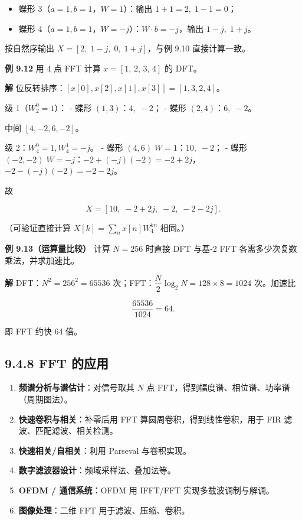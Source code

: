 \begin{itemize}
\tightlist
\item
  蝶形 3（\(a=1,b=1\)，\(W=1\)）：输出 \(1+1=2,\;1-1=0\)；
\item
  蝶形 4（\(a=1,b=1\)，\(W=-j\)）：\(W\cdot b=-j\)，输出 \(1-j,\;1+j\)。
\end{itemize}

按自然序输出 \(X=[2,\;1-j,\;0,\;1+j]\)，与例 9.10 直接计算一致。

\textbf{例 9.12} 用 4 点 FFT 计算 \(x=[1,\,2,\,3,\,4]\) 的 DFT。

\textbf{解} 位反转排序：\([x[0],x[2],x[1],x[3]]=[1,3,2,4]\)。

级 1（\(W_2^0=1\)）： - 蝶形 \((1,3)\)：\(4,\;-2\)； - 蝶形
\((2,4)\)：\(6,\;-2\)。

中间 \([4,-2,6,-2]\)。

级 2：\(W_4^0=1,W_4^1=-j\)。 - 蝶形 \((4,6)\;W=1\)：\(10,\;-2\)； - 蝶形
\((-2,-2)\;W=-j\)：\(-2+(-j)(-2)=-2+2j\)，\(-2-(-j)(-2)=-2-2j\)。

故

\[
X=[10,\;-2+2j,\;-2,\;-2-2j].
\]

（可验证直接计算 \(X[k]=\sum_n x[n]W_4^{kn}\) 相同。）

\textbf{例 9.13（运算量比较）} 计算 \(N=256\) 时直接 DFT 与基-2 FFT
各需多少次复数乘法，并求加速比。

\textbf{解} DFT：\(N^2=256^2=65536\)
次；FFT：\(\dfrac{N}{2}\log_2 N = 128\times8=1024\) 次。加速比

\[
\frac{65536}{1024}=64 .
\]

即 FFT 约快 64 倍。

\subsection{9.4.8 FFT 的应用}\label{fft-ux7684ux5e94ux7528}

\begin{enumerate}
\def\labelenumi{\arabic{enumi}.}
\tightlist
\item
  \textbf{频谱分析与谱估计}：对信号取其 \(N\) 点
  FFT，得到幅度谱、相位谱、功率谱（周期图法）。
\item
  \textbf{快速卷积与相关}：补零后用 FFT 算圆周卷积，得到线性卷积，用于
  FIR 滤波、匹配滤波、相关检测。
\item
  \textbf{快速相关/自相关}：利用 Parseval 与卷积实现。
\item
  \textbf{数字滤波器设计}：频域采样法、叠加法等。
\item
  \textbf{OFDM / 通信系统}：OFDM 用 IFFT/FFT 实现多载波调制与解调。
\item
  \textbf{图像处理}：二维 FFT 用于滤波、压缩、卷积。
\end{enumerate}

